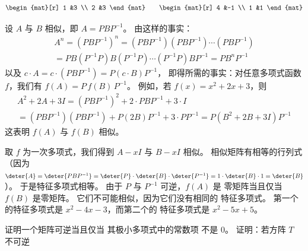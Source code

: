 \begin{exercises}
\begin{exparts}
\begin{equation*}
\begin{mat}[r]
              1  &3  \\
              2  &3
            \end{mat}
            \qquad
            \begin{mat}[r]
              4  &-1 \\
              1  &1
            \end{mat}
          \end{equation*}
     \end{exparts}
     \begin{answer}
       设 \( A \) 与 \( B \) 相似，即 $A=PBP^{-1}$。
       由这样的事实： 
       \begin{multline*}
           A^n=(PBP^{-1})^n=(PBP^{-1})(PBP^{-1})\cdots(PBP^{-1})   \\
                           =PB(P^{-1}P)B(P^{-1}P)\cdots (P^{-1}P)BP^{-1}
                           =PB^nP^{-1}
       \end{multline*}
       以及 $c\cdot A=c\cdot(PBP^{-1})=P(c\cdot B)P^{-1}$，
       即得所需的事实：对任意多项式函数 $f$，我们有 
       \( f(A)=P\,f(B)\,P^{-1} \)。
       例如，若 $f(x)=x^2+2x+3$，则
       \begin{multline*}
         A^2+2A+3I=(PBP^{-1})^2+2\cdot PBP^{-1}+3\cdot I           \\
                  =(PBP^{-1})(PBP^{-1})+P(2B)P^{-1}+3\cdot PP^{-1}
                  =P(B^2+2B+3I)P^{-1}
       \end{multline*}
       这表明 $f(A)$ 与 $f(B)$ 相似。
       \begin{exparts}
         \partsitem 取 $f$ 为一次多项式，我们得到
           $A-xI$ 与 $B-xI$ 相似。
           相似矩阵有相等的行列式（因为 
           $\deter{A}=\deter{PBP^{-1}}
               =\deter{P}\cdot\deter{B}\cdot\deter{P^{-1}}
               =1\cdot\deter{B}\cdot 1=\deter{B}$）。
           于是特征多项式相等。 
         \partsitem 
           由于 \( P \) 与 \( P^{-1} \) 可逆，\( f(A) \) 是
           零矩阵当且仅当 \( f(B) \) 是零矩阵。
         \partsitem 它们不可能相似，因为它们没有相同的
           特征多项式。
           第一个的特征多项式是 
           $x^2-4x-3$，而第二个的
           特征多项式是 $x^2-5x+5$。
       \end{exparts}  
     \end{answer}
   \item 
    \begin{exparts}
     \partsitem 证明一个矩阵可逆当且仅当 
       其极小多项式中的常数项
       不是 $0$。
     \partsitem 证明：若方阵 \( T \) 不可逆     

\end{exparts}
\end{exercises}
